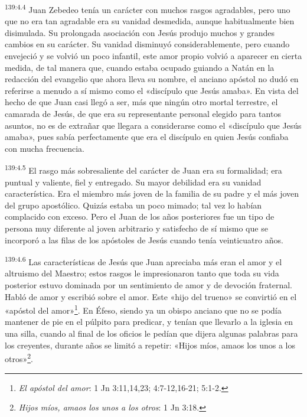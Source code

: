 \par
\textsuperscript{139:4.4} Juan Zebedeo tenía un carácter con muchos rasgos agradables, pero uno que no era tan agradable era su vanidad desmedida, aunque habitualmente bien disimulada. Su prolongada asociación con Jesús produjo muchos y grandes cambios en su carácter. Su vanidad disminuyó considerablemente, pero cuando envejeció y se volvió un poco infantil, este amor propio volvió a aparecer en cierta medida, de tal manera que, cuando estaba ocupado guiando a Natán en la redacción del evangelio que ahora lleva su nombre, el anciano apóstol no dudó en referirse a menudo a sí mismo como el «discípulo que Jesús amaba». En vista del hecho de que Juan casi llegó a ser, más que ningún otro mortal terrestre, el camarada de Jesús, de que era su representante personal elegido para tantos asuntos, no es de extrañar que llegara a considerarse como el «discípulo que Jesús amaba», pues sabía perfectamente que era el discípulo en quien Jesús confiaba con mucha frecuencia.

\par
\textsuperscript{139:4.5} El rasgo más sobresaliente del carácter de Juan era su formalidad; era puntual y valiente, fiel y entregado. Su mayor debilidad era su vanidad característica. Era el miembro más joven de la familia de su padre y el más joven del grupo apostólico. Quizás estaba un poco mimado; tal vez lo habían complacido con exceso. Pero el Juan de los años posteriores fue un tipo de persona muy diferente al joven arbitrario y satisfecho de sí mismo que se incorporó a las filas de los apóstoles de Jesús cuando tenía veinticuatro años.

\par
\textsuperscript{139:4.6} Las características de Jesús que Juan apreciaba más eran el amor y el altruismo del Maestro; estos rasgos le impresionaron tanto que toda su vida posterior estuvo dominada por un sentimiento de amor y de devoción fraternal. Habló de amor y escribió sobre el amor. Este «hijo del trueno» se convirtió en el «apóstol del amor»\footnote{\textit{El apóstol del amor}: 1 Jn 3:11,14,23; 4:7-12,16-21; 5:1-2.}. En Éfeso, siendo ya un obispo anciano que no se podía mantener de pie en el púlpito para predicar, y tenían que llevarlo a la iglesia en una silla, cuando al final de los oficios le pedían que dijera algunas palabras para los creyentes, durante años se limitó a repetir: «Hijos míos, amaos los unos a los otros»\footnote{\textit{Hijos míos, amaos los unos a los otros}: 1 Jn 3:18.}.

